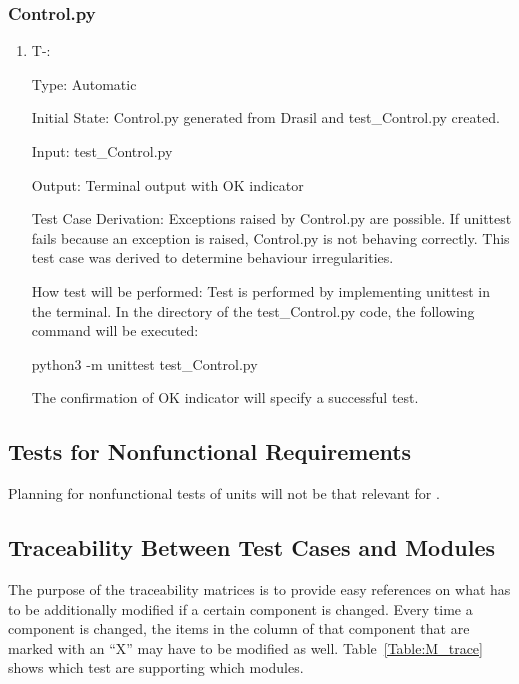 \documentclass[12pt, titlepage]{article}
\newcounter{tinnum} %
\begin{document}
\subsubsection{Control.py}\label{modcontrol}
\begin{enumerate}
\item{T-}\thetinnum\label{T-16}:

Type: Automatic
					
Initial State: Control.py generated from Drasil and test\_Control.py 
created.
					
Input: test\_Control.py
					
Output: Terminal output with OK indicator

Test Case Derivation: Exceptions raised by Control.py are possible. If unittest fails because an exception is raised, Control.py is not behaving correctly. This test case was derived to determine behaviour irregularities.

How test will be performed: Test is performed by implementing unittest in the 
terminal. In the directory of the test\_Control.py code, the following 
command will be executed: 
\begin{center}
python3 -m unittest test\_Control.py
\end{center}

The confirmation of OK indicator will specify a successful test.
			
					
    
\end{enumerate}


\subsection{Tests for Nonfunctional Requirements}

Planning for nonfunctional tests of units will not be that relevant for 
\progname{}.

\subsection{Traceability Between Test Cases and Modules}

The purpose of the traceability matrices is to provide easy references on what
has to be additionally modified if a certain component is changed.  Every time a
component is changed, the items in the column of that component that are marked
with an ``X'' may have to be modified as well.  Table~\ref{Table:M_trace} shows 
which test are supporting which modules.
\end{document}
